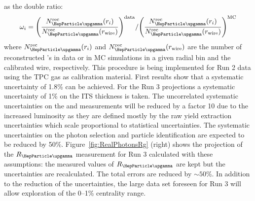 as the double ratio: 
\begin{equation}
\omega_i= 
{\left(\frac{N_{\PGg}^{\rm rec}(r_i)}{N_{\PGg}^{\rm rec}(r_{\rm wire})}\right)^{\rm data}} /
{\left(\frac{N_{\PGg}^{\rm rec}(r_i)}{N_{\PGg}^{\rm rec}(r_{\rm wire})}\right)^{\rm MC}} 
\end{equation}
where $N_{\PGg}^{\rm rec}(r_i)$ and $N_{\PGg}^{\rm rec}(r_{\rm wire})$ are the number of reconstructed \PGg 's in data or in MC simulations in a given radial bin and the calibrated wire, respectively.
This procedure is being implemented for Run 2 data using the TPC gas as calibration material. First results show that a systematic uncertainty of 1.8\% can be achieved. For the Run 3 projections a systematic uncertainty of 1\% on the ITS thickness is taken. The uncorrelated systematic uncertainties on the \PGpz and \PGh measurements will be reduced by a factor 10 due to the increased luminosity as they are defined mostly by the raw yield extraction uncertainties which scale proportional to statistical uncertainties. 
The systematic uncertainties on the photon selection and particle identification are expected to be reduced by 50\%.
Figure~\ref{fig:RealPhotonsRg} (right) shows the projection of the $R_{\PGg}$ measurement 
for Run 3 calculated with these assumptions: the measured values of $R_{\PGg}$ are kept but the uncertainties are recalculated. The total errors are reduced by $\sim50$\%. In addition to the reduction of the uncertainties, the large data set foreseen for Run 3 will allow exploration of the 0--1\% centrality range. 



